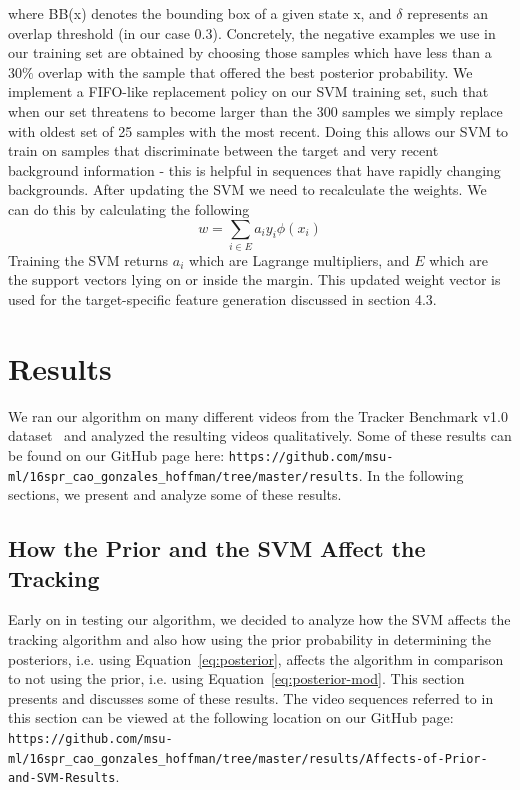 \documentclass{sig-alternate-05-2015}
\begin{document}
where BB(x) denotes the bounding box of a given state x, and $\delta$ represents an overlap threshold (in our case 0.3). Concretely, the negative examples we use in our training set are obtained by choosing those samples which have less than a $30\%$ overlap with the sample that offered the best posterior probability. We implement a FIFO-like replacement policy on our SVM training set, such that when our set threatens to become larger than the 300 samples we simply replace with oldest set of 25 samples with the most recent. Doing this allows our SVM to train on samples that discriminate between the target and very recent background information - this is helpful in sequences that have rapidly changing backgrounds. After updating the SVM we need to recalculate the weights. We can do this by calculating the following\newline
\begin{equation}
	w = \sum_{i\in E}a_iy_i\phi(x_i)
\end{equation}
Training the SVM returns $a_i$ which are Lagrange multipliers, and $E$ which are the support vectors lying on or inside the margin. This updated weight vector is used for the target-specific feature generation discussed in section 4.3.
\section{Results}
We ran our algorithm on many different videos from the Tracker Benchmark v1.0 dataset~\cite{wu2013online} and analyzed the resulting videos qualitatively.
Some of these results can be found on our GitHub page here: \verb!https://github.com/msu-ml/16spr_cao_gonzales_hoffman/tree/master/results!.
In the following sections, we present and analyze some of these results.

\subsection{How the Prior and the SVM Affect the Tracking}
Early on in testing our algorithm, we decided to analyze how the SVM affects the tracking algorithm and also how using the prior probability in determining the posteriors, i.e. using Equation~\ref{eq:posterior}, affects the algorithm in comparison to not using the prior, i.e. using Equation~\ref{eq:posterior-mod}.
This section presents and discusses some of these results.
The video sequences referred to in this section can be viewed at the following location on our GitHub page: \verb!https://github.com/msu-ml/16spr_cao_gonzales_hoffman/tree/master/results/Affects-of-Prior-and-SVM-Results!.
\end{document}
